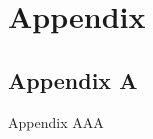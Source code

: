 \chapter{Appendix}\label{chap:appendix}
\begin{appendices}

\section{Appendix A}


Appendix AAA





\end{appendices}



% 











